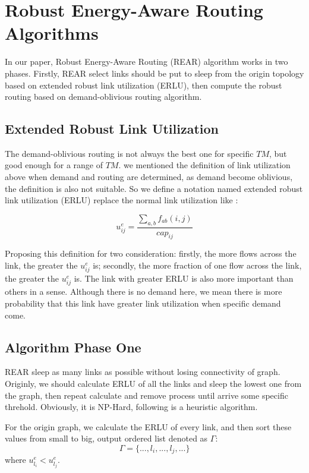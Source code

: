 \documentclass[conference]{IEEEtran}
\begin{document}
\section{Robust Energy-Aware Routing Algorithms}

In our paper, Robust Energy-Aware Routing (REAR) algorithm works in two phases. Firstly, REAR select links
should be put to sleep from the origin topology based on extended robust link utilization (ERLU),
then compute the robust routing based on demand-oblivious routing algorithm.

\subsection{Extended Robust Link Utilization}
The demand-oblivious routing is not always the best one for specific $TM$, but good enough for a range of $TM$.
we mentioned the definition of link utilization above when demand and routing are determined, as demand become
oblivious, the definition is also not suitable. So we define a notation named extended robust link utilization (ERLU)
replace the normal link utilization like :

\begin{equation}
	u^e_{ij} = \frac {\sum_{a,b}f_{ab}(i,j)} {cap_{ij}}
\end{equation}


Proposing this definition for two consideration: firstly, the more flows across the link, the greater the $u^e_{ij}$ is;
secondly, the more fraction of one flow across the link, the greater the $u^e_{ij}$ is. The link with greater
ERLU is also more important than others in a sense. Although there is no demand here, we mean
there is more probability that this link have greater link utilization when specific demand come.

\subsection{Algorithm Phase One}
REAR sleep as many links as possible without losing connectivity of graph.
Originly,  we should calculate ERLU of all the links and sleep the lowest one from the graph, then repeat calculate and remove
process until arrive some specific threhold. Obviously, it is NP-Hard, following is a heuristic algorithm.


For the origin graph, we calculate the ERLU of every link, and then sort these values
from small to big, output ordered list denoted as $\Gamma$:
\begin{equation}
	\Gamma = \{..., l_i, ..., l_j, ...\}
\end{equation}
where $u^e_{l_i} < u^e_{l_j}$.
\end{document}
